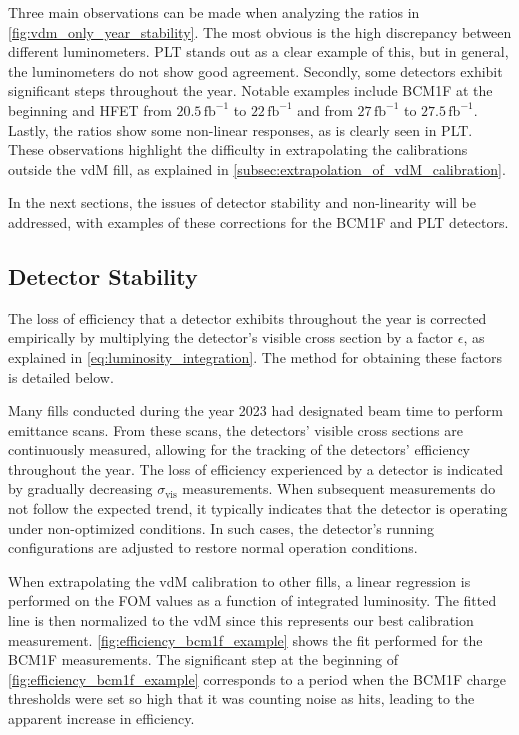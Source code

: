 Three main observations can be made when analyzing the ratios in \autoref{fig:vdm_only_year_stability}. The most obvious is the high discrepancy between different luminometers. PLT stands out as a clear example of this, but in general, the luminometers do not show good agreement. Secondly, some detectors exhibit significant steps throughout the year. Notable examples include BCM1F at the beginning and HFET from \(20.5 \, \text{fb}^{-1}\) to \(22 \, \text{fb}^{-1}\) and from \(27 \, \text{fb}^{-1}\) to \(27.5 \, \text{fb}^{-1}\). Lastly, the ratios show some non-linear responses, as is clearly seen in PLT. These observations highlight the difficulty in extrapolating the calibrations outside the vdM fill, as explained in \autoref{subsec:extrapolation_of_vdM_calibration}.

In the next sections, the issues of detector stability and non-linearity will be addressed, with examples of these corrections for the BCM1F and PLT detectors.

\subsection{Detector Stability}

The loss of efficiency that a detector exhibits throughout the year is corrected empirically by multiplying the detector's visible cross section by a factor \(\epsilon\), as explained in \autoref{eq:luminosity_integration}. The method for obtaining these factors is detailed below.

Many fills conducted during the year 2023 had designated beam time to perform emittance scans. From these scans, the detectors' visible cross sections are continuously measured, allowing for the tracking of the detectors' efficiency throughout the year. The loss of efficiency experienced by a detector is indicated by gradually decreasing \(\sigma_{\mathrm{vis}}\) measurements. When subsequent measurements do not follow the expected trend, it typically indicates that the detector is operating under non-optimized conditions. In such cases, the detector's running configurations are adjusted to restore normal operation conditions.

When extrapolating the vdM calibration to other fills, a linear regression is performed on the FOM values as a function of integrated luminosity. The fitted line is then normalized to the vdM since this represents our best calibration measurement. \autoref{fig:efficiency_bcm1f_example} shows the fit performed for the BCM1F measurements. The significant step at the beginning of \autoref{fig:efficiency_bcm1f_example} corresponds to a period when the BCM1F charge thresholds were set so high that it was counting noise as hits, leading to the apparent increase in efficiency.

